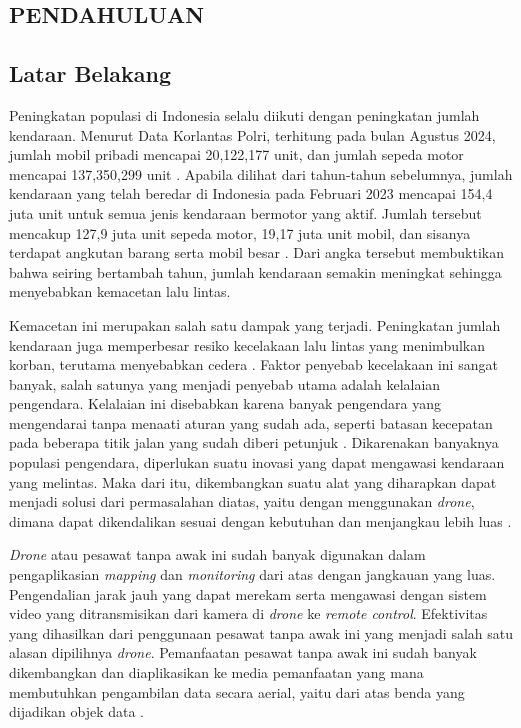 
\begin{spacing}{1.2}
  \chapter{PENDAHULUAN}
\end{spacing}

\vspace{4ex}

\section{Latar Belakang}
Peningkatan populasi di Indonesia selalu diikuti dengan peningkatan jumlah kendaraan. Menurut Data Korlantas Polri, terhitung pada bulan Agustus 2024, jumlah mobil pribadi mencapai 20,122,177 unit, dan jumlah sepeda motor mencapai 137,350,299 unit \cite{datakendaraan2024}. Apabila dilihat dari tahun-tahun sebelumnya, jumlah kendaraan yang telah beredar di Indonesia pada Februari 2023 mencapai 154,4 juta unit untuk semua jenis kendaraan bermotor yang aktif. Jumlah tersebut mencakup 127,9 juta unit sepeda motor, 19,17 juta unit mobil, dan sisanya terdapat angkutan barang serta mobil besar \cite{datakendaraan2023}. Dari angka tersebut membuktikan bahwa seiring bertambah tahun, jumlah kendaraan semakin meningkat sehingga menyebabkan kemacetan lalu lintas.

Kemacetan ini merupakan salah satu dampak yang terjadi. Peningkatan jumlah kendaraan juga memperbesar resiko kecelakaan lalu lintas yang menimbulkan korban, terutama menyebabkan cedera \cite{Ciss2019}. Faktor penyebab kecelakaan ini sangat banyak, salah satunya yang menjadi penyebab utama adalah kelalaian pengendara. Kelalaian ini disebabkan karena banyak pengendara yang mengendarai tanpa menaati aturan yang sudah ada, seperti batasan kecepatan pada beberapa titik jalan yang sudah diberi petunjuk \cite{jurnalspeed-roadsafety-relation}. Dikarenakan banyaknya populasi pengendara, diperlukan suatu inovasi yang dapat mengawasi kendaraan yang melintas. Maka dari itu, dikembangkan suatu alat yang diharapkan dapat menjadi solusi dari permasalahan diatas, yaitu dengan menggunakan \emph{drone}, dimana dapat dikendalikan sesuai dengan kebutuhan dan menjangkau lebih luas \cite{Kanistras2013}.

\emph{Drone} atau pesawat tanpa awak ini sudah banyak digunakan dalam pengaplikasian \emph{mapping} dan \emph{monitoring} dari atas dengan jangkauan yang luas. Pengendalian jarak jauh yang dapat merekam serta mengawasi dengan sistem video yang ditransmisikan dari kamera di \emph{drone} ke \emph{remote control}. Efektivitas yang dihasilkan dari penggunaan pesawat tanpa awak ini yang menjadi salah satu alasan dipilihnya \emph{drone}. Pemanfaatan pesawat tanpa awak ini sudah banyak dikembangkan dan diaplikasikan ke media pemanfaatan yang mana membutuhkan pengambilan data secara aerial, yaitu dari atas benda yang dijadikan objek data \cite{ZhangZhu2023}.

